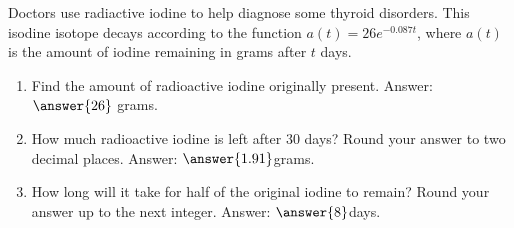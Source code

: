 \documentclass{ximera}
\author{Ivo Terek}
\begin{document}
\licenseSZ
\begin{exercise}

  Doctors use radiactive iodine to help diagnose some thyroid disorders. This isodine isotope decays according to the function $a(t) = 26e^{-0.087t}$, where $a(t)$ is the amount of iodine remaining in grams after $t$ days.

  \begin{enumerate}
  \item Find the amount of radioactive iodine originally present. Answer: $\answer{26}$ grams.
  \item How much radioactive iodine is left after $30$ days? Round your answer to two decimal places. Answer: $\answer{1.91}$\calcHW grams.
  \item How long will it take for half of the original iodine to remain? Round your answer up to the next integer. Answer: $\answer{8}$\calcHW days.
  \end{enumerate}

\end{exercise}
\end{document}
